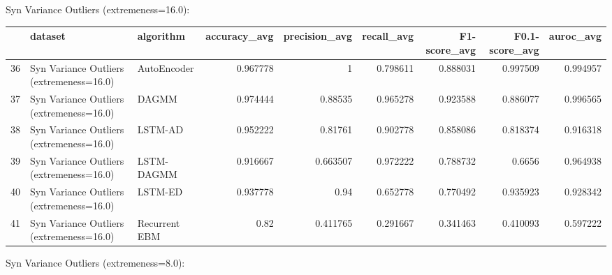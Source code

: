 Syn Variance Outliers (extremeness=16.0):

\begin{tabular}{rllrrrrrr}
\hline
    & dataset                                  & algorithm     &   accuracy\_avg &   precision\_avg &   recall\_avg &   F1-score\_avg &   F0.1-score\_avg &   auroc\_avg \\
\hline
 36 & Syn Variance Outliers (extremeness=16.0) & AutoEncoder   &       0.967778 &        1        &     0.798611 &       0.888031 &         0.997509 &    0.994957 \\
 37 & Syn Variance Outliers (extremeness=16.0) & DAGMM         &       0.974444 &        0.88535  &     0.965278 &       0.923588 &         0.886077 &    0.996565 \\
 38 & Syn Variance Outliers (extremeness=16.0) & LSTM-AD       &       0.952222 &        0.81761  &     0.902778 &       0.858086 &         0.818374 &    0.916318 \\
 39 & Syn Variance Outliers (extremeness=16.0) & LSTM-DAGMM    &       0.916667 &        0.663507 &     0.972222 &       0.788732 &         0.6656   &    0.964938 \\
 40 & Syn Variance Outliers (extremeness=16.0) & LSTM-ED       &       0.937778 &        0.94     &     0.652778 &       0.770492 &         0.935923 &    0.928342 \\
 41 & Syn Variance Outliers (extremeness=16.0) & Recurrent EBM &       0.82     &        0.411765 &     0.291667 &       0.341463 &         0.410093 &    0.597222 \\
\hline
\end{tabular}

Syn Variance Outliers (extremeness=8.0):

